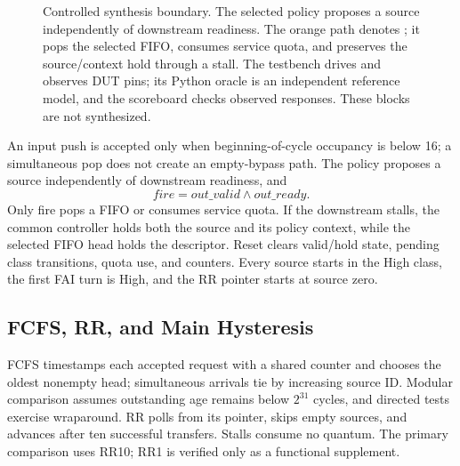 \begin{figure}[t]
{
}
\caption{Controlled synthesis boundary. The selected policy proposes a source independently of downstream readiness. The orange path denotes ; it pops the selected FIFO, consumes service quota, and preserves the source/context hold through a stall. The testbench drives and observes DUT pins; its Python oracle is an independent reference model, and the scoreboard checks observed responses. These blocks are not synthesized.}
\label{fig:architecture}
\end{figure}

An input push is accepted only when beginning-of-cycle occupancy is below 16; a simultaneous pop does not create an empty-bypass path. The policy proposes a source independently of downstream readiness, and
\begin{equation}
\mathit{fire}=\mathit{out\_valid}\land\mathit{out\_ready}.
\end{equation}
Only fire pops a FIFO or consumes service quota. If the downstream stalls, the common controller holds both the source and its policy context, while the selected FIFO head holds the descriptor. Reset clears valid/hold state, pending class transitions, quota use, and counters. Every source starts in the High class, the first FAI turn is High, and the RR pointer starts at source zero.

\subsection{FCFS, RR, and Main Hysteresis}
FCFS timestamps each accepted request with a shared counter and chooses the oldest nonempty head; simultaneous arrivals tie by increasing source ID. Modular comparison assumes outstanding age remains below $2^{31}$ cycles, and directed tests exercise wraparound. RR polls from its pointer, skips empty sources, and advances after ten successful transfers. Stalls consume no quantum. The primary comparison uses RR10; RR1 is verified only as a functional supplement.


